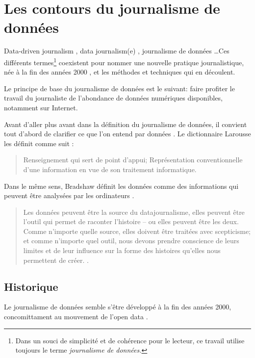 
\chapter{Les contours du journalisme de données}


\og Data-driven journalism \fg, \og data journalism(e) \fg, \og journalisme de données \fg\dots Ces différents 
termes\footnote{Dans un souci de simplicité et de cohérence pour le lecteur, ce travail utilise toujours 
le terme \em journalisme de données\em.} 
coexistent pour nommer une nouvelle pratique journalistique, née à la fin des années 2000 \cite{bradshaw}, et les 
méthodes et techniques qui en découlent. 

Le principe de base du journalisme de données est le suivant: faire profiter le travail du journaliste 
de l'abondance de données numériques disponibles, notamment sur Internet. 

Avant d'aller plus avant dans la définition du journalisme de données, il convient tout d'abord de clarifier ce que l'on entend par \og données \fg.
Le dictionnaire Larousse les définit comme suit : 
\begin{quote}\og Renseignement qui sert de point d'appui; Représentation conventionnelle d'une information en vue de son traitement informatique.\fg \end{quote}

Dans le même sens, Bradshaw définit les données comme \og des informations qui peuvent être analysées par les ordinateurs \fg \cite{bradshaw}.


\begin{quote}
\og Les données peuvent être la source du datajournalisme, elles peuvent être l'outil qui permet de raconter l'histoire -- ou elles peuvent être les deux. 
Comme n'importe quelle source, elles doivent être traitées avec scepticisme; et comme n'importe quel outil, nous devons prendre conscience de leurs limites et de leur influence sur la forme des histoires qu'elles nous permettent de créer. \fg  %
\cite{handbookfr}.
\end{quote}



\section{Historique}

Le journalisme de données semble s'être développé à la fin des années 2000, concomittament au mouvement de l'\og open data \fg. 


